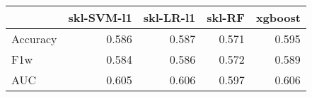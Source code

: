 \begin{tabular}{lrrrr}
\toprule
{} &  skl-SVM-l1 &  skl-LR-l1 &  skl-RF &  xgboost \\
\midrule
Accuracy &       0.586 &      0.587 &   0.571 &    0.595 \\
F1w      &       0.584 &      0.586 &   0.572 &    0.589 \\
AUC      &       0.605 &      0.606 &   0.597 &    0.606 \\
\bottomrule
\end{tabular}
